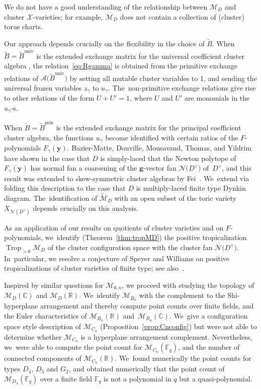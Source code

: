 \documentclass[10pt,a4paper]{amsart}
\def\R{{\mathbb R}}
\def\C{{\mathbb C}}
\def\F{{\mathbb F}}
\def\A{{\mathcal{A}}}
\def\prin{{\operatorname{prin}}}
\def\univ{{\operatorname{univ}}}
\def\tB{{\tilde B}}
\def\M{{\mathcal{M}}}
\def\tM{{\widetilde {\mathcal{M}}}}
\def\tB{{\tilde B}}
\def\y{{\mathbf y}}
\def\N{{\mathcal{N}}}
\def\Trop{\operatorname{Trop}}
\def\g{{\mathbf g}}
\numberwithin{equation}{section}
\begin{document}
We do not have a good understanding of the relationship between $\M_D$ and cluster ${\mathcal{X}}$-varieties; for example, $\M_D$ does not contain a collection of (cluster) torus charts.

Our approach depends crucially on the flexibility in the choice of $\tB$. When $\tB = \tB^\univ$ is the extended exchange matrix for the universal coefficient cluster algebra \cite{CA4,Reading}, the relation~\eqref{eq:Rgamma} is obtained from the primitive exchange relations of $\A\big(\tB^\univ\big)$ by setting all mutable cluster variables to 1, and sending the universal frozen variables $z_\gamma$ to $u_\gamma$. The~non-primitive exchange relations give rise to other relations of the form $U + U' = 1$, where $U$ and $U'$ are monomials in the $u_\gamma$-s.

When $\tB = \tB^\prin$ is the extended exchange matrix for the principal coefficient cluster algebra, the functions $u_\gamma$ become identified with certain ratios of the $F$-polynomials $F_\gamma(\y)$. Bazier-Matte, Douville, Mousavand, Thomas, and Yildrim have shown \cite{BDMTY} in the case that $D$ is simply-laced that the Newton polytope of $F_\gamma(\y)$ has normal fan a coarsening of the $\g$-vector fan $\N\big(D^\vee\big)$ of~$D^\vee$, and this result was extended to skew-symmetric cluster algebras by Fei~\cite{Fei2}. We~extend via folding this description to the case that $D$ is multiply-laced finite type Dynkin diagram. The~identification of $\tM_D$ with an open subset of the toric variety $X_{\N(D^\vee)}$ depends crucially on this analysis.

As an application of our results on quotients of cluster varieties and on $F$-polynomials, we~identify (Theorem~\ref{thm:tropMD}) the positive tropicalization $\Trop_{>0} \M_D$ of the cluster configuration space with the cluster fan $\N\big(D^\vee\big)$. In~particular, we resolve a conjecture of Speyer and Williams \cite[Conjecture~8.1]{SW} on positive tropicalizations of cluster varieties of finite type; see also~\cite{JLS}.

\bigskip{}
Inspired by similar questions for $\M_{0,n}$, we proceed with studying the topology of $\M_{D}(\C)$ and $\M_{D}(\R)$. We~identify $\M_{B_n}$ with the complement to the Shi-hyperplane arrangement and thereby compute point counts over finite fields, and the Euler characteristics of $\M_{B_n}(\R)$ and~$\M_{B_n}(\C)$. We~give a configuration space style description of $\M_{C_n}$ (Proposition~\ref{prop:Cnconfig}) but were not able to determine whether $\M_{C_n}$ is a hyperplane arrangement complement. Nevertheless, we~were able to compute the point count for $\M_{C_n}(\F_q)$, and the number of connected components of $\M_{C_n}(\R)$. We~found numerically the point counts for types $D_4$, $D_5$ and $G_2$, and obtained numerically that the point count of $\M_{D_4}(\F_q)$ over a finite field $\F_q$ is not a polynomial in $q$ but a quasi-polynomial.
\end{document}
